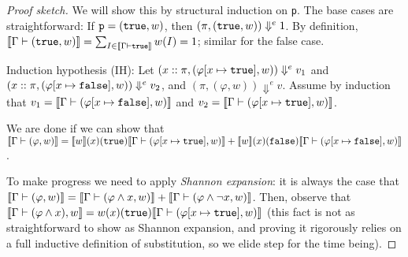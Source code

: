 \documentclass{tufte-handout}
\begin{document}
\begin{proof}[Proof sketch]
  We will show this by structural induction on \texttt{p}. 
  The base cases are straightforward: If $\texttt{p} = (\texttt{true}, w)$, then 
  $(\pi, (\texttt{true}, w)) \Downarrow^e 1$. By definition, $\llbracket {\Gamma \vdash (\texttt{true}, w)} \rrbracket = \sum_{I \in \llbracket {\Gamma \vdash \texttt{true}} \rrbracket} w(I) = 1$; 
  similar for the false case.

  Induction hypothesis (IH): Let $(x::\pi, (\varphi[x \mapsto \texttt{true}], w))
  \Downarrow^e v_1$ and $(x::\pi, (\varphi[x \mapsto \texttt{false}], w)) \Downarrow^e
  v_2$, and $(\pi, (\varphi, w)) \Downarrow^e v$. Assume by induction that $v_1
  = \llbracket {\Gamma \vdash (\varphi[x \mapsto \texttt{false}], w)} \rrbracket$ and $v_2 =
  \llbracket {\Gamma \vdash (\varphi [x \mapsto \texttt{true}], w)} \rrbracket$. 
  
  We are done if we can show that
$\llbracket {\Gamma \vdash (\varphi, w)} \rrbracket =
\llbracket {w} \rrbracket(x)(\texttt{true})\llbracket {\Gamma \vdash (\varphi[x \mapsto \texttt{true}], w)} \rrbracket +
\llbracket {w} \rrbracket(x)(\texttt{false})\llbracket {\Gamma \vdash (\varphi[x \mapsto \texttt{false}], w)} \rrbracket$.

To make progress we need to apply \emph{Shannon expansion}: it is always the case that 
$\llbracket {\Gamma \vdash (\varphi, w)} \rrbracket = \llbracket {\Gamma \vdash (\varphi \land x, w)} \rrbracket + 
\llbracket {\Gamma \vdash (\varphi \land \neg x, w)} \rrbracket$.
Then, observe that $\llbracket {\Gamma \vdash (\varphi \land x), w} \rrbracket = w(x)(\texttt{true})
\llbracket {\Gamma \vdash (\varphi[x \mapsto \texttt{true}], w)} \rrbracket$ (this fact is not as straightforward
to show as Shannon expansion, and proving it rigorously relies on a 
full inductive definition of substitution, so we elide step for the time being). 






\end{proof}
\end{document}
